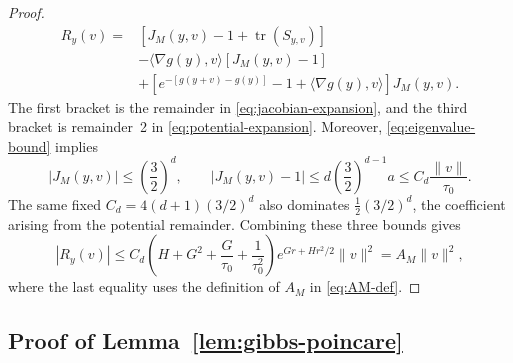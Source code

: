 \documentclass{article}
\numberwithin{equation}{section}
\begin{document}
\begin{proof}
\begin{align*}
 R_y(v)
 ={}&\left[J_M(y,v)-1+\operatorname{tr}(S_{y,v})\right]\\
 &-\langle\nabla g(y),v\rangle\left[J_M(y,v)-1\right]\\
 &+\left[e^{-[g(y+v)-g(y)]}-1
          +\langle\nabla g(y),v\rangle\right]J_M(y,v).
\end{align*}
The first bracket is the remainder in
\eqref{eq:jacobian-expansion}, and the third bracket is remainder~2 in
\eqref{eq:potential-expansion}.  Moreover,
\eqref{eq:eigenvalue-bound} implies
\[
|J_M(y,v)|\le\left(\frac32\right)^d,
\qquad
|J_M(y,v)-1|
 \le d\left(\frac32\right)^{d-1}a
 \le C_d\frac{\lVert v\rVert}{\tau_0}.
\]
The same fixed $C_d=4(d+1)(3/2)^d$ also dominates
$\frac12(3/2)^d$, the coefficient arising from the potential remainder.
Combining these three bounds gives
\[
 |R_y(v)|
 \le C_d\left(
 H+G^2+\frac{G}{\tau_0}+\frac{1}{\tau_0^2}
 \right)e^{Gr+Hr^2/2}\lVert v\rVert^2
 =A_M\lVert v\rVert^2,
\]
where the last equality uses the definition of $A_M$ in
\eqref{eq:AM-def}.
\end{proof}



\subsection{Proof of Lemma~\ref{lem:gibbs-poincare}}
\end{document}
